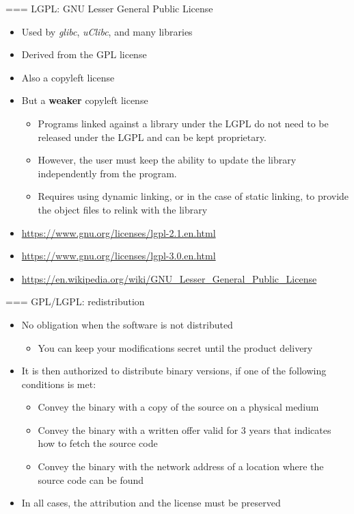 === {LGPL: GNU Lesser General Public License}
  \begin{itemize}
  \item Used by {\em glibc}, {\em uClibc}, and many libraries
  \item Derived from the GPL license
  \item Also a copyleft license
  \item But a {\bf weaker} copyleft license
    \begin{itemize}
    \item Programs linked against a library under the LGPL do not need
      to be released under the LGPL and can be kept proprietary.
    \item However, the user must keep the ability to update the
      library independently from the program.
    \item Requires using dynamic linking, or in the case of static
      linking, to provide the object files to relink with the library
    \end{itemize}
  \item \url{https://www.gnu.org/licenses/lgpl-2.1.en.html}
  \item \url{https://www.gnu.org/licenses/lgpl-3.0.en.html}
  \item
    \url{https://en.wikipedia.org/wiki/GNU_Lesser_General_Public_License}
  \end{itemize}


=== {GPL/LGPL: redistribution}
  \begin{itemize}
  \item No obligation when the software is not distributed
    \begin{itemize}
    \item You can keep your modifications secret until the product
      delivery
    \end{itemize}
  \item It is then authorized to distribute binary versions, if one of
    the following conditions is met:
    \begin{itemize}
    \item Convey the binary with a copy of the source on a physical
      medium
    \item Convey the binary with a written offer valid for 3 years
      that indicates how to fetch the source code
    \item Convey the binary with the network address of a location
      where the source code can be found
    \end{itemize}
  \item In all cases, the attribution and the license must be
    preserved
  \end{itemize}


